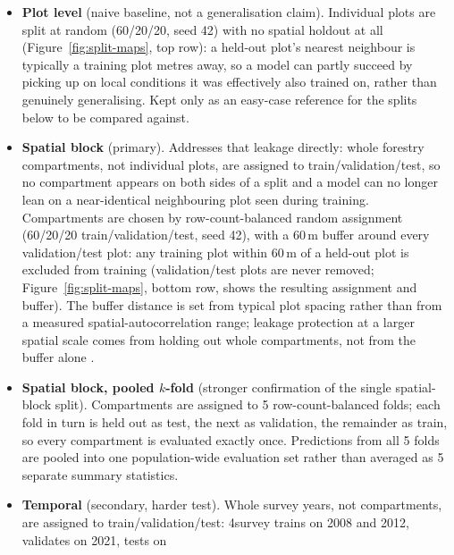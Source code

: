 \documentclass[11pt,a4paper]{report}
\begin{document}
\begin{itemize}
\setlength\itemsep{0pt}
\item \textbf{Plot level} (naive baseline, not a generalisation claim). Individual plots are split
  at random (60/20/20, seed 42) with no spatial holdout at all (Figure~\ref{fig:split-maps}, top
  row): a held-out plot's nearest neighbour is typically a training plot metres away, so a model
  can partly succeed by picking up on local conditions it was effectively also trained on, rather
  than genuinely generalising. Kept only as an easy-case reference for the splits below to be
  compared against.
\item \textbf{Spatial block} (primary). Addresses that leakage directly: whole forestry
  compartments, not individual plots, are assigned to train/validation/test, so no compartment
  appears on both sides of a split and a model can no longer lean on a near-identical neighbouring
  plot seen during training. Compartments are chosen by row-count-balanced random assignment
  (60/20/20 train/validation/test, seed 42), with a 60\,m buffer around every validation/test
  plot: any training plot within 60\,m of a held-out plot is excluded from training
  (validation/test plots are never removed; Figure~\ref{fig:split-maps}, bottom row, shows the
  resulting assignment and buffer). The buffer distance is set from typical plot spacing rather
  than from a measured spatial-autocorrelation range; leakage protection at a larger spatial scale
  comes from holding out whole compartments, not from the buffer alone
  \citep{roberts2017}. %
\item \textbf{Spatial block, pooled $k$-fold} (stronger confirmation of the single spatial-block
  split). Compartments are assigned to 5 row-count-balanced folds; each fold in turn is held out
  as test, the next as validation, the remainder as train, so every compartment is evaluated
  exactly once. Predictions from all 5 folds are pooled into one population-wide evaluation set
  rather than averaged as 5 separate summary statistics.
\item \textbf{Temporal} (secondary, harder test). Whole survey years, not compartments, are
  assigned to train/validation/test: 4survey trains on 2008 and 2012, validates on 2021, tests on

\end{itemize}
\end{document}
